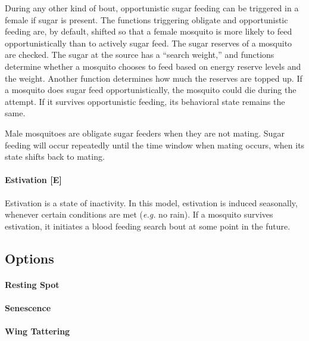 \documentclass{article}
\newcommand{\eg}{{\em e.g. }}
\begin{document}
During any other kind of bout, opportunistic sugar feeding can be triggered in a female if sugar is present. The functions triggering obligate and opportunistic feeding are, by default, shifted so that a female mosquito is more likely to feed opportunistically than to actively sugar feed. The sugar reserves of a mosquito are checked. The sugar at the source has a ``search weight,'' and functions determine whether a mosquito chooses to feed based on energy reserve levels and the weight. Another function determines how much the reserves are topped up. If a mosquito does sugar feed opportunistically, the mosquito could die during the attempt. If it survives opportunistic feeding, its behavioral state remains the same. 

Male mosquitoes are obligate sugar feeders when they are not mating. Sugar feeding will occur repeatedly until the time window when mating occurs, when its state shifts back to mating. 



\paragraph{Estivation [E]}

Estivation is a state of inactivity. In this model, estivation is induced seasonally, whenever certain conditions are met (\eg no rain). If a mosquito survives estivation, it initiates a blood feeding search bout at some point in the future.

\subsection{Options}

\paragraph{Resting Spot}

\paragraph{Senescence}

\paragraph{Wing Tattering}
\end{document}
